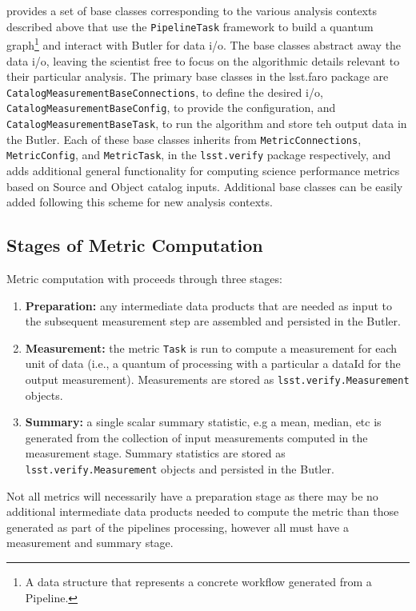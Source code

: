 \faro provides a set of base classes corresponding to the various analysis contexts described above that use the \texttt{PipelineTask} framework to build a quantum graph\footnote{A data structure that represents a concrete workflow generated from a Pipeline.} and interact with Butler for data i/o.
The base classes abstract away the data i/o, leaving the scientist free to focus on the algorithmic details  relevant to their particular analysis. 
The primary base classes in the lsst.faro package are \texttt{CatalogMeasurementBaseConnections}, to define the desired i/o,  \texttt{CatalogMeasurementBaseConfig}, to provide the configuration, and \texttt{CatalogMeasurementBaseTask}, to run the algorithm and store teh output data in the Butler. 
Each of these base classes inherits from \texttt{MetricConnections}, \texttt{MetricConfig}, and \texttt{MetricTask}, in the \texttt{lsst.verify} package respectively, and adds additional general functionality for computing science performance metrics based on Source and Object catalog inputs. 
Additional base classes can be easily added following this scheme for new analysis contexts. 

\subsection{Stages of Metric Computation} \label{ssec:stages}

Metric computation with \faro proceeds through three stages:
\begin{enumerate}
\item \textbf{Preparation:}  any intermediate data products that are needed as input to the subsequent measurement step are assembled and persisted in the Butler.	
\item \textbf{Measurement:} the metric \texttt{Task} is run to compute a measurement for each unit of data (i.e., a quantum of processing with a particular a dataId for the output measurement). Measurements are stored as \texttt{lsst.verify.Measurement} objects.
\item \textbf{Summary:}  a single scalar summary statistic, e.g a mean, median, etc is generated from the collection of input measurements computed in the measurement stage.  Summary statistics are stored as \texttt{lsst.verify.Measurement} objects and persisted in the Butler.
\end{enumerate}
Not all metrics will necessarily have a  preparation stage as there may be no additional intermediate data products needed to compute the metric than those generated as part of the pipelines processing, however all must have a measurement and summary stage. 

